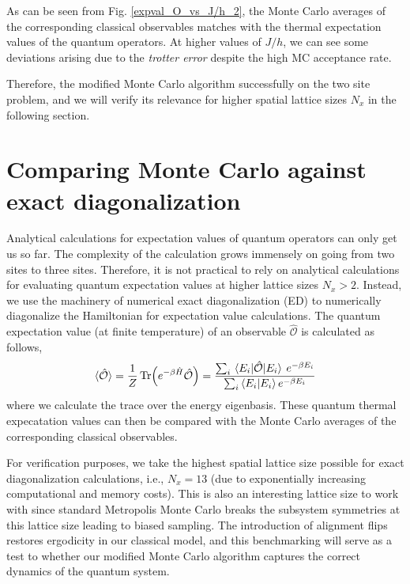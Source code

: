 \documentclass[../thesis_main.tex]{subfiles}
\begin{document}
\FloatBarrier
As can be seen from Fig. \ref{expval_O_vs_J/h_2}, the Monte Carlo averages of the corresponding classical observables matches with the thermal expectation values of the quantum operators. At higher values of $J/h$, we can see some deviations arising due to the \textit{trotter error} despite the high MC acceptance rate.

Therefore, the modified Monte Carlo algorithm successfully  on the two site problem, and we will verify its relevance for higher spatial lattice sizes $N_x$ in the following section.

\section{Comparing Monte Carlo against exact diagonalization}
Analytical calculations for expectation values of quantum operators can only get us so far. The complexity of the calculation grows immensely on going from two sites to three sites. Therefore, it is not practical to rely on analytical calculations for evaluating quantum expectation values at higher lattice sizes $N_x>2$. Instead, we use the machinery of numerical exact diagonalization (ED) to numerically diagonalize the Hamiltonian for expectation value calculations. The quantum expectation value (at finite temperature) of an observable $\hat{\mathcal{O}}$ is calculated as follows, 
\begin{equation}
    \langle \hat{\mathcal{O}} \rangle =  \frac{1}{Z} \Tr(e^{-\beta \hat{H}} \hat{\mathcal{O}}) = \frac{\sum_{i} \mel{E_i}{\hat{\mathcal{O}}}{E_i} \: e^{-\beta E_i}}{\sum_i \braket{E_i}{E_i} e^{-\beta E_i}}
\end{equation}
where we calculate the trace over the energy eigenbasis. These quantum thermal expecatation values can then be compared with the Monte Carlo averages of the corresponding classical observables.

For verification purposes, we take the highest spatial lattice size possible for exact diagonalization calculations, i.e., $N_x = 13$ (due to exponentially increasing computational and memory costs). This is also an interesting lattice size to work with since standard Metropolis Monte Carlo breaks the subsystem symmetries at this lattice size leading to biased sampling. The introduction of alignment flips restores ergodicity in our classical model, and this benchmarking will serve as a test to whether our modified Monte Carlo algorithm captures the correct dynamics of the quantum system.
\end{document}
